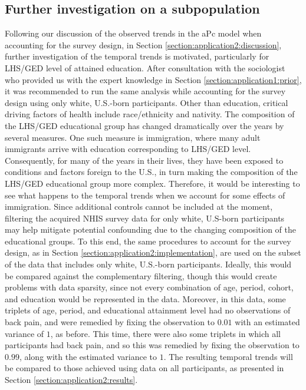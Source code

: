 \subsection{Further investigation on a subpopulation}
\label{section:application2:extension}
Following our discussion of the observed trends in the aPc model when accounting for the survey design, in Section \ref{section:application2:discussion}, further investigation of the temporal trends is motivated, particularly for LHS/GED level of attained education. After consultation with the sociologist who provided us with the expert knowledge in Section \ref{section:application1:prior}, it was recommended to run the same analysis while accounting for the survey design using only white, U.S.-born participants. Other than education, critical driving factors of health include race/ethnicity and nativity. The composition of the LHS/GED educational group has changed dramatically over the years by several measures. One such measure is immigration, where many adult immigrants arrive with education corresponding to LHS/GED level. Consequently, for many of the years in their lives, they have been exposed to conditions and factors foreign to the U.S., in turn making the composition of the LHS/GED educational group more complex. Therefore, it would be interesting to see what happens to the temporal trends when we account for some effects of immigration. Since additional controls cannot be included at the moment, filtering the acquired NHIS survey data for only white, U.S-born participants may help mitigate potential confounding due to the changing composition of the educational groups. To this end, the same procedures to account for the survey design, as in Section \ref{section:application2:implementation}, are used on the subset of the data that includes only white, U.S.-born participants. Ideally, this would be compared against the complementary filtering, though this would create problems with data sparsity, since not every combination of age, period, cohort, and education would be represented in the data. Moreover, in this data, some triplets of age, period, and educational attainment level had no observations of back pain, and were remedied by fixing the observation to $0.01$ with an estimated variance of $1$, as before. This time, there were also some triplets in which all participants had back pain, and so this was remedied by fixing the observation to $0.99$, along with the estimated variance to $1$. The resulting temporal trends will be compared to those achieved using data on all participants, as presented in Section \ref{section:application2:results}. 

